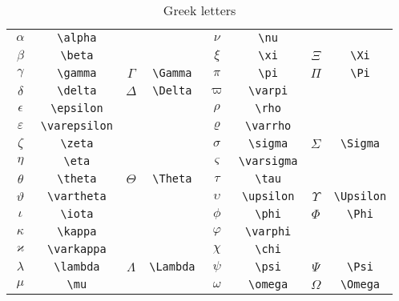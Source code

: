 \documentclass[captions=tableheading]{scrartcl}
\begin{document}
\begin{table}
  \caption{Greek letters}
  \label{tab:greek-letters}
  \centering
  \begin{tabular}[c]{cccc@{\hskip 3em}cccc}
    \toprule
    $\alpha$ & \verb|\alpha| & & &
    $\nu$ & \verb|\nu| & & \\
    $\beta$ & \verb|\beta| & & &
    $\xi$ & \verb|\xi| & $\Xi$ & \verb|\Xi| \\
    $\gamma$ & \verb|\gamma| & $\Gamma$ & \verb|\Gamma| &
    $\pi$ & \verb|\pi| & $\Pi$ & \verb|\Pi| \\
    $\delta$ & \verb|\delta| & $\Delta$ & \verb|\Delta| &
    $\varpi$ & \verb|\varpi| & & \\
    $\epsilon$ & \verb|\epsilon| & & &
    $\rho$ & \verb|\rho| & & \\
    \addlinespace
    $\varepsilon$ & \verb|\varepsilon| & & &
    $\varrho$ & \verb|\varrho| & & \\
    $\zeta$ & \verb|\zeta| & & &
    $\sigma$ & \verb|\sigma| & $\Sigma$ & \verb|\Sigma| \\
    $\eta$ & \verb|\eta| & & &
    $\varsigma$ & \verb|\varsigma| & & \\
    $\theta$ & \verb|\theta| & $\Theta$ & \verb|\Theta| &
    $\tau$ & \verb|\tau| & & \\
    $\vartheta$ & \verb|\vartheta| & & &
    $\upsilon$ & \verb|\upsilon| & $\Upsilon$ & \verb|\Upsilon| \\
    \addlinespace
    $\iota$ & \verb|\iota| & & &
    $\phi$ & \verb|\phi| & $\Phi$ & \verb|\Phi| \\
    $\kappa$ & \verb|\kappa| & & &
    $\varphi$ & \verb|\varphi| & & \\
    $\varkappa$ & \verb|\varkappa| & & &
    $\chi$ & \verb|\chi| & & \\
    $\lambda$ & \verb|\lambda| & $\Lambda$ & \verb|\Lambda| &
    $\psi$ & \verb|\psi| & $\Psi$ & \verb|\Psi| \\
    $\mu$ & \verb|\mu| & & &
    $\omega$ & \verb|\omega| & $\Omega$ & \verb|\Omega| \\
    \bottomrule
  \end{tabular}
\end{table}
\end{document}
